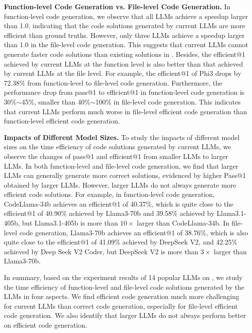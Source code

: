\textbf{Function-level Code Generation vs. File-level Code Generation.} 
In function-level code generation, we observe that all LLMs achieve a speedup larger than 1.0, indicating that the code solutions generated by current LLMs are more efficient than ground truths. However, only three LLMs achieve a speedup larger than 1.0 in the file-level code generation. This suggests that current LLMs cannot generate faster code solutions than existing solutions in \bench. Besides, the efficient@1 achieved by current LLMs at the function level is also better than that achieved by current LLMs at the file level. For example, the efficient@1 of Phi3 drops by 72.38\% from function-level to file-level code generation. Furthermore, the performance drop from pass@1 to efficient@1 in function-level code generation is 30\%$\sim$45\%, smaller than 40\%$\sim$100\% in file-level code generation. This indicates that current LLMs perform much worse in file-level efficient code generation than function-level efficient code generation.





\textbf{Impacts of Different Model Sizes.}
To study the impacts of different model sizes on the time efficiency of code solutions generated by current LLMs, we observe the changes of pass@1 and efficient@1 from smaller LLMs to larger LLMs. In both function-level and file-level code generation, we find that larger LLMs can generally generate more correct solutions, evidenced by higher Pass@1 obtained by larger LLMs. However, larger LLMs do not always generate more efficient code solutions. For example, in function-level code generation, CodeLlama-34b achieves an efficient@1 of 40.37\%, which is quite close to the efficient@1 of 40.90\% achieved by Llama3-70b and 39.58\% achieved by Llama3.1-405b, but Llama3.1-405b is more than $10\times$ larger than CodeLlama-34b. In file-level code generation, Llama3-70b achieves an efficient@1 of 38.76\%, which is also quite close to the efficient@1 of 41.09\% achieved by DeepSeek V2, and 42.25\% achieved by Deep Seek V2 Coder, but DeepSeek V2 is more than $3\times$ larger than Llama3-70b. 



In summary, based on the experiment results of 14 popular LLMs on \bench, we study the time efficiency of function-level and file-level code solutions generated by the LLMs in four aspects. We find efficient code generation much more challenging for current LLMs than correct code generation, especially for file-level efficient code generation. We also identify that larger LLMs do not always perform better on efficient code generation.
